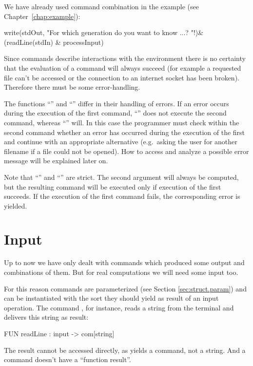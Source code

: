 We have already used command combination in the
 example (see Chapter~\ref{chap:example}):
\begin{prog}
          write(stdOut,
                  "For which generation do you want to know ...? "!)\&
          (readLine(stdIn) \& 
          processInput)
\end{prog}
\medskip

Since commands describe interactions with the environment there is no
certainty  that the  evaluation of a
command will always succeed (for example a requested file can't be accessed or
the connection to an internet socket has been broken).
Therefore there must be some error-handling.

The functions ``\pro{;}'' and ``\pro{\&}'' differ in their handling of
errors. 
If an error occurs during the execution of the first command,  ``\pro{\&}''
does not execute the second command, whereas
``\pro{;}'' will.
In this case the programmer must check within the
second command whether an error has occurred during the execution of the first
 and continue with an appropriate alternative (e.g.~asking the user
for another filename if a file could not be opened).
How to access and analyze a possible error message will be explained
later on.

Note that ``\pro{;}'' and ``\pro{\&}'' are strict. 
The second argument will always be computed, but the resulting command
will be executed only if execution of the first  succeeds. 
If the execution of the first command fails, the corresponding error
is yielded. 


\section{Input}
\label{sec:input}
\advanced
Up to now we have only dealt with commands which produced some
output and combinations of them.
But for real computations we will need some input too.

For this reason commands are parameterized (see Section
\ref{sec:struct.param}) and can be instantiated with the sort they
should yield as result of an input operation.
The command , for instance, reads a string from
the terminal and delivers this string as  result:
\begin{prog}
        FUN readLine : input -> com[string]
\end{prog}

The result cannot be accessed directly, as  yields a
command, not a string. And a command doesn't have a
``function result''.


